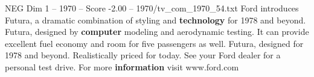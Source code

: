 \begin{textsample}{NEG Dim 1 – 1970 – Score -2.00 – 1970/tv\_com\_1970\_54.txt}  \label{ex:f1_neg_062}
Ford introduces Futura, a dramatic combination of styling and \textbf{technology} for 1978 and beyond.
Futura, designed by \textbf{computer} modeling and aerodynamic testing.
It can provide excellent fuel economy and room for five passengers as well.
Futura, designed for 1978 and beyond.
Realistically priced for today.
See your Ford dealer for a personal test drive.
For more \textbf{information} visit www.ford.com

\end{textsample}

